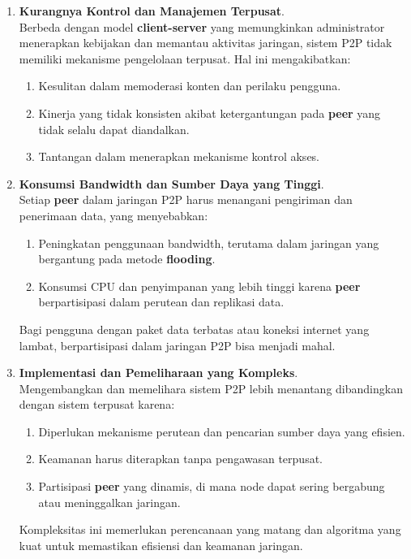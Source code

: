 \begin{enumerate}
	\item \textbf{Kurangnya Kontrol dan Manajemen Terpusat}. \\
	Berbeda dengan model \textbf{client-server} yang memungkinkan administrator menerapkan kebijakan dan memantau aktivitas jaringan, sistem P2P tidak memiliki mekanisme pengelolaan terpusat. Hal ini mengakibatkan:
	\begin{enumerate}
		\item Kesulitan dalam memoderasi konten dan perilaku pengguna.
		\item Kinerja yang tidak konsisten akibat ketergantungan pada \textbf{peer} yang tidak selalu dapat diandalkan.
		\item Tantangan dalam menerapkan mekanisme kontrol akses.
	\end{enumerate}
	
	\item \textbf{Konsumsi Bandwidth dan Sumber Daya yang Tinggi}. \\
	Setiap \textbf{peer} dalam jaringan P2P harus menangani pengiriman dan penerimaan data, yang menyebabkan:
	\begin{enumerate}
		\item Peningkatan penggunaan bandwidth, terutama dalam jaringan yang bergantung pada metode \textbf{flooding}.
		\item Konsumsi CPU dan penyimpanan yang lebih tinggi karena \textbf{peer} berpartisipasi dalam perutean dan replikasi data.
	\end{enumerate}
	Bagi pengguna dengan paket data terbatas atau koneksi internet yang lambat, berpartisipasi dalam jaringan P2P bisa menjadi mahal.
	
	\item \textbf{Implementasi dan Pemeliharaan yang Kompleks}. \\
	Mengembangkan dan memelihara sistem P2P lebih menantang dibandingkan dengan sistem terpusat karena:
	\begin{enumerate}
		\item Diperlukan mekanisme perutean dan pencarian sumber daya yang efisien.
		\item Keamanan harus diterapkan tanpa pengawasan terpusat.
		\item Partisipasi \textbf{peer} yang dinamis, di mana node dapat sering bergabung atau meninggalkan jaringan.
	\end{enumerate}
	Kompleksitas ini memerlukan perencanaan yang matang dan algoritma yang kuat untuk memastikan efisiensi dan keamanan jaringan.
\end{enumerate}

